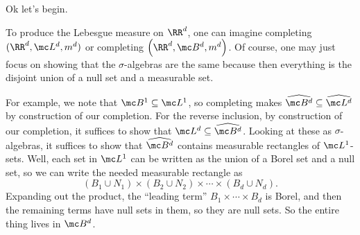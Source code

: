 \documentclass[../notes.tex]{subfiles}
\begin{document}
Ok let's begin.
\begin{remark}
	To produce the Lebesgue measure on $\RR^d$, one can imagine completing $(\RR^d,\mc L^d,m^d)$ or completing $\left(\RR^d,\mc B^d,m^d\right)$. Of course, one may just focus on showing that the $\sigma$-algebras are the same because then everything is the disjoint union of a null set and a measurable set.

	For example, we note that $\mc B^1\subseteq\mc L^1$, so completing makes $\widehat{\mc B^d}\subseteq\widehat{\mc L^d}$ by construction of our completion. For the reverse inclusion, by construction of our completion, it suffices to show that $\mc L^d\subseteq\widehat{\mc B^d}$. Looking at these as $\sigma$-algebras, it suffices to show that $\widehat{\mc B^d}$ contains measurable rectangles of $\mc L^1$-sets. Well, each set in $\mc L^1$ can be written as the union of a Borel set and a null set, so we can write the needed measurable rectangle as
	\[(B_1\cup N_1)\times(B_2\cup N_2)\times\cdots\times(B_d\cup N_d).\]
	Expanding out the product, the ``leading term'' $B_1\times\cdots\times B_d$ is Borel, and then the remaining terms have null sets in them, so they are null sets. So the entire thing lives in $\mc B^d$.
\end{remark}
\end{document}
